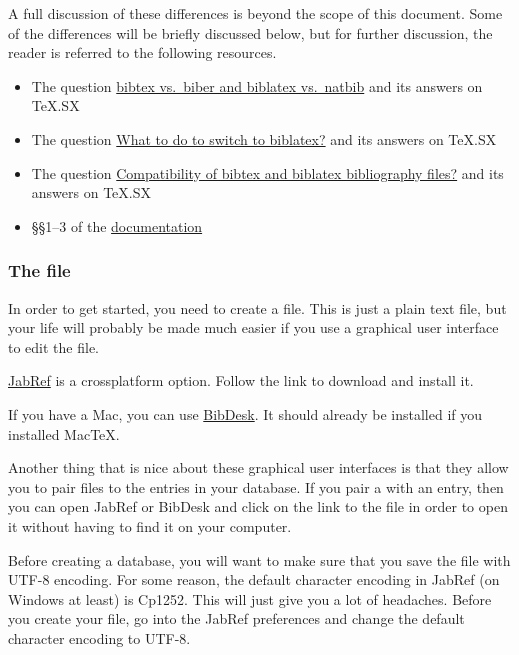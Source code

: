 A full discussion of these differences is beyond the scope of this document.
Some of the differences will be briefly discussed below, but for further discussion, the reader is referred to the following resources.

\begin{itemize}

	\item{The question \href{http://tex.stackexchange.com/q/25701/32888}{bibtex vs.~biber and biblatex vs.~natbib} and its answers on TeX.SX}
	
	\item{The question \href{http://tex.stackexchange.com/q/5091/32888}{What to do to switch to biblatex?} and its answers on TeX.SX}
	
	\item{The question \href{http://tex.stackexchange.com/q/37095/32888}{Compatibility of bibtex and biblatex bibliography files?} and its answers on TeX.SX}
	
	\item{\S\S1--3 of the \href{http://texdoc.net/texmf-dist/doc/latex/biblatex/biblatex.pdf}{ documentation}}

\end{itemize}

\subsubsection{The  file}
\label{subsubsec:the-bib-file}

In order to get started, you need to create a  file.
This is just a plain text file, but your life will probably be made much easier if you use a graphical user interface to edit the file.

\href{http://jabref.sourceforge.net/}{JabRef} is a crossplatform option.
Follow the link to download and install it.

If you have a Mac, you can use \href{http://bibdesk.sourceforge.net/}{BibDesk}.
It should already be installed if you installed {Mac\TeX}.

Another thing that is nice about these graphical user interfaces is that they allow you to pair  files to the entries in your database.
If you pair a  with an entry, then you can open JabRef or BibDesk and click on the link to the  file in order to open it without having to find it on your computer.

Before creating a database, you will want to make sure that you save the  file with UTF-8 encoding.
For some reason, the default character encoding in JabRef (on Windows at least) is Cp1252.
This will just give you a lot of headaches.
Before you create your  file, go into the JabRef preferences and change the default character encoding to UTF-8.

